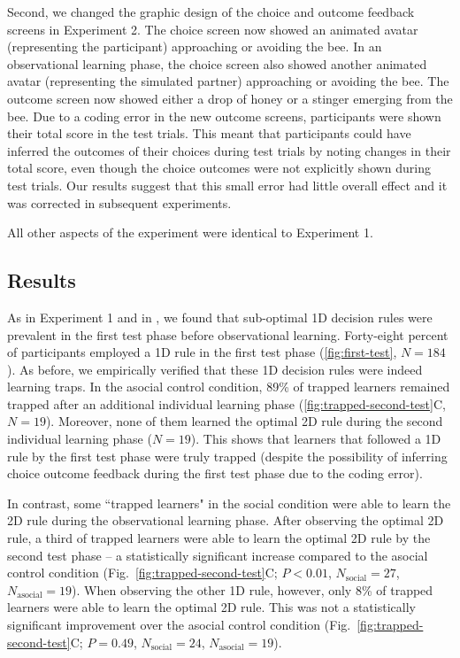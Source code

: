 \documentclass[11pt]{article} %
\begin{document}
Second, we changed the graphic design of the choice and outcome feedback screens in Experiment 2. The choice screen now showed an animated avatar (representing the participant) approaching or avoiding the bee. In an observational learning phase, the choice screen also showed another animated avatar (representing the simulated partner) approaching or avoiding the bee. The outcome screen now showed either a drop of honey or a stinger emerging from the bee. Due to a coding error in the new outcome screens, participants were shown their total score in the test trials. This meant that participants could have inferred the outcomes of their choices during test trials by noting changes in their total score, even though the choice outcomes were not explicitly shown during test trials.  Our results suggest that this small error had little overall effect and it was corrected in subsequent experiments.


All other aspects of the experiment were identical to Experiment 1.

\subsection{Results}

As in Experiment 1 and in \citeauthor{richLimitsLearningExploration2018} \citeyear{richLimitsLearningExploration2018}, we found that sub-optimal 1D decision rules were prevalent in the first test phase before observational learning. Forty-eight percent of participants employed a 1D rule in the first test phase (\ref{fig:first-test}, $N=184$). As before, we empirically verified that these 1D decision rules were indeed learning traps. In the asocial control condition, 89\% of trapped learners remained trapped after an additional individual learning phase (\ref{fig:trapped-second-test}C, $N=19$). Moreover, none of them learned the optimal 2D rule during the second individual learning phase ($N=19$). This shows that learners that followed a 1D rule by the first test phase were truly trapped (despite the possibility of inferring choice outcome feedback during the first test phase due to the coding error). 

In contrast, some ``trapped learners" in the social condition were able to learn the 2D rule during the observational learning phase. After observing the optimal 2D rule, a third of trapped learners were able to learn the optimal 2D rule by the second test phase -- a statistically significant increase compared to the asocial control condition (Fig.~\ref{fig:trapped-second-test}C; $P<0.01$, $N_{\text{social}}=27$, $N_{\text{asocial}}=19$). When observing the other 1D rule, however, only 8\% of trapped learners were able to learn the optimal 2D rule. This was not a statistically significant improvement over the asocial control condition (Fig.~\ref{fig:trapped-second-test}C; $P=0.49$, $N_{\text{social}}=24$, $N_{\text{asocial}}=19$). 
\end{document}

